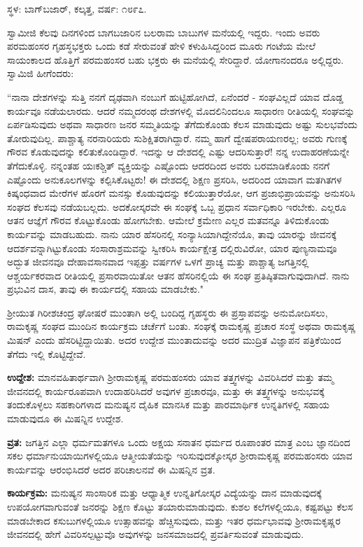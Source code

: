 \centerline{ಸ್ಥಳ: ಬಾಗ್‌ಬಜಾರ್, ಕಲ್ಕತ್ತ, ವರ್ಷ: ೧೮೯೭.}

ಸ್ವಾಮೀಜಿ ಕೆಲವು ದಿನಗಳಿಂದ ಬಾಗಬಜಾರಿನ ಬಲರಾಮ ಬಾಬುಗಳ ಮನೆಯಲ್ಲಿ ಇದ್ದರು. ಇಂದು ಅವರು ಪರಮಹಂಸರ ಗೃಹಸ್ಥಭಕ್ತರು ಒಂದು ಕಡೆ ಸೇರುವಂತೆ ಹೇಳಿ ಕಳುಹಿಸಿದ್ದರಿಂದ ಮೂರು ಗಂಟೆಯ ಮೇಲೆ ಸಾಯಂಕಾಲದ ಹೊತ್ತಿಗೆ ಪರಮಹಂಸರ ಬಹು ಭಕ್ತರು ಈ ಮನೆಯಲ್ಲಿ ಸೇರಿದ್ದಾರೆ. ಯೋಗಾನಂದರೂ ಅಲ್ಲಿದ್ದರು. ಸ್ವಾಮಿಜಿ ಹೀಗೆಂದರು:

“ನಾನಾ ದೇಶಗಳನ್ನು ಸುತ್ತಿ ನನಗೆ ದೃಢವಾಗಿ ನಂಬುಗೆ ಹುಟ್ಟಿಹೋಗಿದೆ, ಏನೆಂದರೆ - ಸಂಘವಿಲ್ಲದೆ ಯಾವ ದೊಡ್ಡ ಕಾರ್ಯವೂ ನಡೆಯಲಾರದು. ಆದರೆ ನಮ್ಮದರಂಥ ದೇಶಗಳಲ್ಲಿ ಮೊದಲಿನಿಂದಲೂ ಸಾಧಾರಣ ರೀತಿಯಲ್ಲಿ ಸಂಘವನ್ನು ಏರ್ಪಡಿಸುವುದು ಅಥವಾ ಸಾಧಾರಣ ಜನರ ಸಮ್ಮತಿಯನ್ನು ತೆಗೆದುಕೊಂಡು ಕೆಲಸ ಮಾಡುವುದು ಅಷ್ಟು ಸುಲಭವೆಂದು ತೋರುವುದಿಲ್ಲ. ಪಾಶ್ಚಾತ್ಯ ನರನಾರಿಯರು ಸುಶಿಕ್ಷಿತರಾಗಿದ್ದಾರೆ. ನಮ್ಮ ಹಾಗೆ ದ್ವೇಷಪರಾಯಣರಲ್ಲ; ಅವರು ಗುಣಕ್ಕೆ ಗೌರವ ಕೊಡುವುದನ್ನು ಕಲಿತುಕೊಂಡಿದ್ದಾರೆ. ಇದನ್ನು ಆ ದೇಶದಲ್ಲಿ ಎಷ್ಟು ಆದರಿಸುತ್ತಾರೆ! ನನ್ನ ಉದಾಹರಣೆಯನ್ನೇ ತೆಗೆದುಕೊಳ್ಳಿ. ನನ್ನಂತಹ ಯಃಕಶ್ಚಿತ್ ವ್ಯಕ್ತಿಯನ್ನು ಎಷ್ಟೊಂದು ಆದರದಿಂದ ಅವರು ಬರಮಾಡಿಕೊಂಡು ನನಗೆ ಎಷ್ಟೊಂದು ಅನುಕೂಲಗಳನ್ನು ಕಲ್ಪಿಸಿಕೊಟ್ಟರು! ಈ ದೇಶದಲ್ಲಿ ಶಿಕ್ಷಣ ಪ್ರಸರಿಸಿ, ಅದರಿಂದ ಯಾವಾಗ ಮತಗಿತಗಳ ಕಿಷ್ಕಂಧವಾದ ಮೇರೆಗಳ ಹೊರಗೆ ಮನಸ್ಸು ಕೊಡುವುದನ್ನು ಕಲಿಯುತ್ತಾರೆಯೋ, ಆಗ ಪ್ರಜಾಭಿಪ್ರಾಯವನ್ನು ಅನುಸರಿಸಿ ಸಂಘದ ಕೆಲಸವು ನಡೆಯಬಲ್ಲದು. ಅದಕೋಸ್ಕರವೇ ಈ ಸಂಘಕ್ಕೆ ಒಬ್ಬ ಪ್ರಧಾನ ಸರ್ವಾಧಿಕಾರಿ ಇರಬೇಕು. ಎಲ್ಲರೂ ಆತನ ಆಜ್ಞೆಗೆ ಗೌರವ ಕೊಟ್ಟುಕೊಂಡು ಹೋಗಬೇಕು. ಆಮೇಲೆ ಕ್ರಮೇಣ ಎಲ್ಲರ ಮತವನ್ನೂ ತಿಳಿದುಕೊಂಡು ಕಾರ್ಯವನ್ನು ಮಾಡಬಹುದು. ನಾನು ಯಾರ ಹೆಸರಿನಲ್ಲಿ ಸಂನ್ಯಾಸಿಯಾಗಿದ್ದೇನೆಯೊ, ತಾವು ಯಾರನ್ನು ಜೀವನಕ್ಕೆ ಆದರ್ಶವನ್ನಾಗಿಟ್ಟುಕೊಂಡು ಸಂಸಾರಾಶ್ರಮವನ್ನು ಸ್ವೀಕರಿಸಿ ಕಾರ್ಯಕ್ಷೇತ್ರ ದಲ್ಲಿರುವಿರೋ, ಯಾರ ಪುಣ್ಯನಾಮವೂ ಅದ್ಭುತ ಜೀವನವೂ ದೇಹಾವಸಾನವಾದ ಇಪ್ಪತ್ತು ವರ್ಷಗಳ ಒಳಗೆ ಪ್ರಾಚ್ಯ ಮತ್ತು ಪಾಶ್ಚಾತ್ಯ ಜಗತ್ತಿನಲ್ಲಿ ಆಶ್ಚರ್ಯಕರವಾದ ರೀತಿಯಲ್ಲಿ ಪ್ರಸಾರವಾಯಿತೋ ಆತನ ಹೆಸರಿನಲ್ಲಿಯೆ ಈ ಸಂಘ ಪ್ರತಿಷ್ಠಿತವಾಗುವುದಾಗಿದೆ. ನಾನು ಪ್ರಭುವಿನ ದಾಸ, ತಾವು ಈ ಕಾರ್ಯದಲ್ಲಿ ಸಹಾಯ ಮಾಡಬೇಕು."

ಶ‍್ರೀಯುತ ಗಿರೀಶಚಂದ್ರ ಘೋಷರೆ ಮುಂತಾಗಿ ಅಲ್ಲಿ ಬಂದಿದ್ದ ಗೃಹಸ್ಥರು ಈ ಪ್ರಸ್ತಾಪವನ್ನು ಅನುಮೋದಿಸಲು, ರಾಮಕೃಷ್ಣ ಸಂಘದ ಮುಂದಿನ ಕಾರ್ಯಕ್ರಮ ಚರ್ಚೆಗೆ ಬಂತು. ಸಂಘಕ್ಕೆ ರಾಮಕೃಷ್ಣ ಪ್ರಚಾರ ಸಂಸ್ಥೆ ಅಥವಾ ರಾಮಕೃಷ್ಣ ಮಿಷನ್ ಎಂದು ಹೆಸರಿಟ್ಟಿದ್ದಾಯಿತು. ಅದರ ಉದ್ದೇಶ ಮುಂತಾದುವನ್ನು ಅದರ ಮುದ್ರಿತ ವಿಜ್ಞಾಪನ ಪತ್ರಿಕೆಯಿಂದ ತೆಗೆದು ಇಲ್ಲಿ ಕೊಟ್ಟಿದ್ದೇವೆ.

\textbf{ಉದ್ದೇಶ:} ಮಾನವಹಿತಾರ್ಥವಾಗಿ ಶ‍್ರೀರಾಮಕೃಷ್ಣ ಪರಮಹಂಸರು ಯಾವ ತತ್ತ್ವಗಳನ್ನು ವಿವರಿಸಿದರೆ ಮತ್ತು ತಮ್ಮ ಜೀವನದಲ್ಲಿ ಕಾರ್ಯರೂಪವಾಗಿ ಉದಾಹರಿಸಿದರೆ ಅವುಗಳ ಪ್ರಚಾರವೂ, ಮತ್ತು ಈ ತತ್ತ್ವಗಳನ್ನು ಅನುಭವಕ್ಕೆ ತಂದುಕೊಳ್ಳಲು ಸಹಕಾರಿಗಳಾದ ಮನುಷ್ಯನ ದೈಹಿಕ ಮಾನಸಿಕ ಮತ್ತು ಪಾರಮಾರ್ಥಿಕ ಉನ್ನತಿಗಳಲ್ಲಿ ಸಹಾಯ ಮಾಡುವುದೂ ಈ ಮಿಷನ್ನಿನ ಉದ್ದೇಶ.

\textbf{ವ್ರತ:} ಜಗತ್ತಿನ ಎಲ್ಲಾ ಧರ್ಮಮತಗಳೂ ಒಂದು ಅಕ್ಷಯ ಸನಾತನ ಧರ್ಮದ ರೂಪಾಂತರ ಮಾತ್ರ ಎಂಬ ಜ್ಞಾನದಿಂದ ಸಕಲ ಧರ್ಮಾನುಯಾಯಿಗಳಲ್ಲಿಯೂ ಆತ್ಮೀಯತೆಯನ್ನು ಇರಿಸುವುದಕ್ಕೋಸ್ಕರ ಶ‍್ರೀರಾಮಕೃಷ್ಣ ಪರಮಹಂಸರು ಯಾವ ಕಾರ್ಯವನ್ನು ಆರಂಭಿಸಿದರೆ ಅದರ ಪರಿಚಾಲನವೆ ಈ ಮಿಷನ್ನಿನ ವ್ರತ.

\textbf{ಕಾರ್ಯಕ್ರಮ:} ಮನುಷ್ಯನ ಸಾಂಸಾರಿಕ ಮತ್ತು ಆಧ್ಯಾತ್ಮಿಕ ಉನ್ನತಿಗೋಸ್ಕರ ವಿದ್ಯೆಯನ್ನು ದಾನ ಮಾಡುವುದಕ್ಕೆ ಉಪಯೋಗವಾಗುವಂತೆ ಜನರನ್ನು ಶಿಕ್ಷಣ ಕೊಟ್ಟು ತಯಾರುಮಾಡುವುದು. ಕುಶಲ ಕಲೆಗಳಲ್ಲಿಯೂ, ಕಷ್ಟಪಟ್ಟು ಕೆಲಸ ಮಾಡಬೇಕಾದ ಕಸುಬುಗಳಲ್ಲಿಯೂ ಉತ್ಸಾಹವನ್ನು ಹೆಚ್ಚಿಸುವುದು, ಮತ್ತು ಇತರ ಧರ್ಮಭಾವವು ಶ‍್ರೀರಾಮಕೃಷ್ಣರ ಜೀವನದಲ್ಲಿ ಹೇಗೆ ವಿವರಿಸಲ್ಪಟ್ಟುವೊ ಅವುಗಳನ್ನು ಜನಸಮಾಜದಲ್ಲಿ ಪ್ರವರ್ತಿಸುವಂತೆ ಮಾಡುವುದು.

